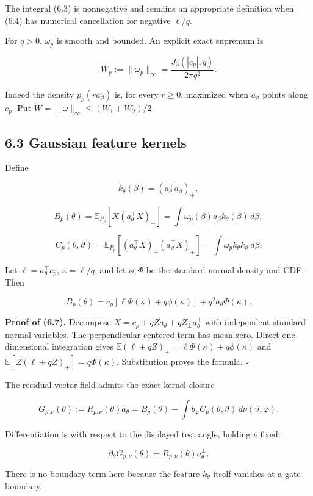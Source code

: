 \documentclass[
  10pt,
]{article}
\begin{document}
The integral (6.3) is nonnegative and remains an appropriate definition
when (6.4) has numerical cancellation for negative \(\ell/q\).

For \(q>0\), \(\omega_p\) is smooth and bounded. An explicit exact
supremum is

\[
 W_p:=\|\omega_p\|_\infty=
 \frac{J_3(|c_p|,q)}{2\pi q^2}.
 \tag{6.5}
\]

Indeed the density \(p_p(r a_\beta)\) is, for every \(r\ge0\), maximized
when \(a_\beta\) points along \(c_p\). Put
\(W=\|\omega\|_\infty\le(W_1+W_2)/2\).

\subsection{6.3 Gaussian feature
kernels}\label{gaussian-feature-kernels}

Define

\[
 k_\theta(\beta)=(a_\theta^\top a_\beta)_+,
\]

\[
 B_p(\theta)=\mathbb E_{P_p}[X(a_\theta^\top X)_+]
 =\int\omega_p(\beta)a_\beta k_\theta(\beta)\,d\beta,
\]

\[
 C_p(\theta,\vartheta)
 =\mathbb E_{P_p}[(a_\theta^\top X)_+(a_\vartheta^\top X)_+]
 =\int\omega_p k_\theta k_\vartheta\,d\beta.
 \tag{6.6}
\]

Let \(\ell=a_\theta^\top c_p\), \(\kappa=\ell/q\), and let \(\phi,\Phi\)
be the standard normal density and CDF. Then

\[
 B_p(\theta)=c_p[\ell\Phi(\kappa)+q\phi(\kappa)]
 +q^2a_\theta\Phi(\kappa).
 \tag{6.7}
\]

\textbf{Proof of (6.7).} Decompose
\(X=c_p+qZa_\theta+qZ_\perp a_\theta^\perp\) with independent standard
normal variables. The perpendicular centered term has mean zero. Direct
one-dimensional integration gives
\(\mathbb E(\ell+qZ)_+=\ell\Phi(\kappa)+q\phi(\kappa)\) and
\(\mathbb E[Z(\ell+qZ)_+]=q\Phi(\kappa)\). Substitution proves the
formula. \(\square\)

The residual vector field admits the exact kernel closure

\[
 G_{p,\nu}(\theta):=R_{p,\nu}(\theta)a_\theta
 =B_p(\theta)-\int b_\varphi C_p(\theta,\vartheta)\,d\nu(\vartheta,\varphi).
 \tag{6.8}
\]

Differentiation is with respect to the displayed test angle, holding
\(\nu\) fixed:

\[
 \partial_\theta G_{p,\nu}(\theta)
 =R_{p,\nu}(\theta)a_\theta^\perp.
 \tag{6.9}
\]

There is no boundary term here because the feature \(k_\theta\) itself
vanishes at a gate boundary.
\end{document}
